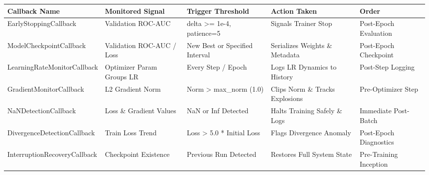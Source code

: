 \begin{tabular}{lllll}
\toprule
Callback Name & Monitored Signal & Trigger Threshold & Action Taken & Order \\
\midrule
EarlyStoppingCallback & Validation ROC-AUC & delta >= 1e-4, patience=5 & Signals Trainer Stop & Post-Epoch Evaluation \\
ModelCheckpointCallback & Validation ROC-AUC / Loss & New Best or Specified Interval & Serializes Weights \& Metadata & Post-Epoch Checkpoint \\
LearningRateMonitorCallback & Optimizer Param Groups LR & Every Step / Epoch & Logs LR Dynamics to History & Post-Step Logging \\
GradientMonitorCallback & L2 Gradient Norm & Norm > max\_norm (1.0) & Clips Norm \& Tracks Explosions & Pre-Optimizer Step \\
NaNDetectionCallback & Loss \& Gradient Values & NaN or Inf Detected & Halts Training Safely \& Logs & Immediate Post-Batch \\
DivergenceDetectionCallback & Train Loss Trend & Loss > 5.0 * Initial Loss & Flags Divergence Anomaly & Post-Epoch Diagnostics \\
InterruptionRecoveryCallback & Checkpoint Existence & Previous Run Detected & Restores Full System State & Pre-Training Inception \\
\bottomrule
\end{tabular}
